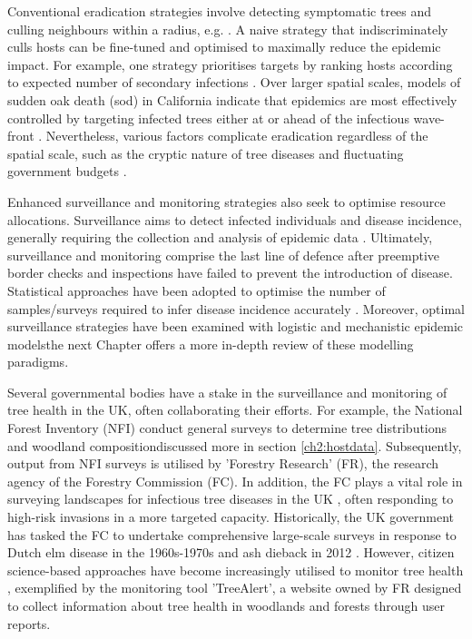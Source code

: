 Conventional eradication strategies involve detecting symptomatic trees and culling neighbours within a radius, e.g. \cite{WEBIDEMICS}.
A naive strategy that indiscriminately culls hosts can be fine-tuned and optimised to maximally reduce the epidemic impact. 
For example, one strategy prioritises targets by ranking hosts according to expected number of secondary infections \cite{risk-potential-control}.
Over larger spatial scales, models of sudden oak death (\acrshort{sod}) in California indicate that epidemics are most effectively controlled by targeting infected trees either at or ahead of the infectious wave-front \cite{large-scale-control}.
Nevertheless, various factors complicate eradication regardless of the spatial scale, such as the cryptic nature of tree diseases and fluctuating government budgets \cite{control-theory, control-theory-application}.

Enhanced surveillance and monitoring strategies also seek to optimise resource allocations. 
Surveillance aims to detect infected individuals and disease incidence, generally requiring the collection and analysis of epidemic data \cite{surveillance-review}.
Ultimately, surveillance and monitoring comprise the last line of defence after preemptive border checks and inspections have failed to prevent the introduction of disease. 
Statistical approaches have been adopted to optimise the number of samples/surveys required to infer disease incidence accurately \cite{yamamura2016sampling}.
Moreover, optimal surveillance strategies have been examined with logistic \cite{parnell2012estimating} and mechanistic \cite{WEBIDEMICS} epidemic models\textemdash the next Chapter offers a more in-depth review of these modelling paradigms. 

Several governmental bodies have a stake in the surveillance and monitoring of tree health in the UK, often collaborating their efforts. For example, the National Forest Inventory (NFI) conduct general surveys to determine tree distributions and woodland composition\textemdash discussed more in section \ref{ch2:hostdata}. Subsequently, output from NFI surveys is utilised by  'Forestry Research' (FR), the research agency of the Forestry Commission (FC). In addition, the FC plays a vital role in surveying landscapes for infectious tree diseases in the UK \cite{ryle1969forest, james1990history}, often responding to high-risk invasions in a more targeted capacity. Historically, the UK government has tasked the FC to undertake comprehensive large-scale surveys in response to Dutch elm disease in the 1960s-1970s \cite{potter2011learning} and ash dieback in 2012 \cite{tomlinson2016discovery}. 
However, citizen science-based approaches have become increasingly utilised to monitor tree health \cite{brown2020role}, exemplified by the monitoring tool 'TreeAlert', a website owned by FR designed to collect information about tree health in woodlands and forests through user reports.

